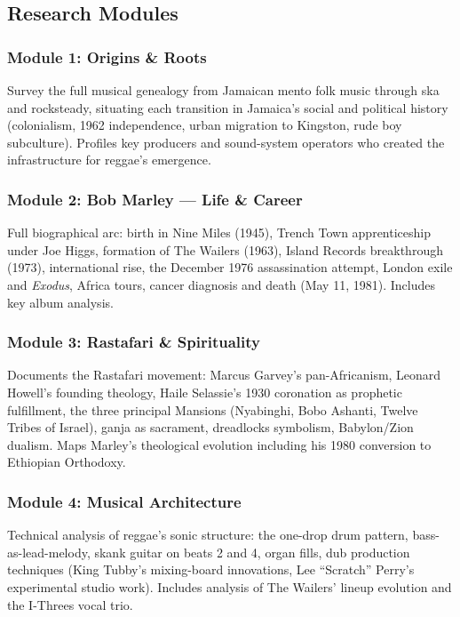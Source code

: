 \documentclass[11pt,letterpaper]{article}
\begin{document}
\subsection{Research Modules}

\subsubsection{Module 1: Origins \& Roots}
Survey the full musical genealogy from Jamaican mento folk music through ska and rocksteady, situating each transition in Jamaica's social and political history (colonialism, 1962 independence, urban migration to Kingston, rude boy subculture). Profiles key producers and sound-system operators who created the infrastructure for reggae's emergence.

\subsubsection{Module 2: Bob Marley --- Life \& Career}
Full biographical arc: birth in Nine Miles (1945), Trench Town apprenticeship under Joe Higgs, formation of The Wailers (1963), Island Records breakthrough (1973), international rise, the December 1976 assassination attempt, London exile and \textit{Exodus}, Africa tours, cancer diagnosis and death (May 11, 1981). Includes key album analysis.

\subsubsection{Module 3: Rastafari \& Spirituality}
Documents the Rastafari movement: Marcus Garvey's pan-Africanism, Leonard Howell's founding theology, Haile Selassie's 1930 coronation as prophetic fulfillment, the three principal Mansions (Nyabinghi, Bobo Ashanti, Twelve Tribes of Israel), ganja as sacrament, dreadlocks symbolism, Babylon/Zion dualism. Maps Marley's theological evolution including his 1980 conversion to Ethiopian Orthodoxy.

\subsubsection{Module 4: Musical Architecture}
Technical analysis of reggae's sonic structure: the one-drop drum pattern, bass-as-lead-melody, skank guitar on beats 2 and 4, organ fills, dub production techniques (King Tubby's mixing-board innovations, Lee ``Scratch'' Perry's experimental studio work). Includes analysis of The Wailers' lineup evolution and the I-Threes vocal trio.
\end{document}
